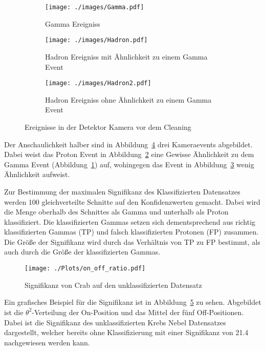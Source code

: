 \begin{figure}[H]
  \centering
\begin{subfigure}[t]{0.3\textwidth}
  \centering
  \texttt{[image: ./images/Gamma.pdf]}
  \caption{Gamma Ereigniss}
  \label{fig:gammaevent}
\end{subfigure}
\begin{subfigure}[t]{0.3\textwidth}
  \centering
  \texttt{[image: ./images/Hadron.pdf]}
  \caption{Hadron Ereigniss mit Ähnlichkeit zu einem Gamma Event}
  \label{fig:hadevent}
\end{subfigure}
\begin{subfigure}[t]{0.3\textwidth}
  \centering
  \texttt{[image: ./images/Hadron2.pdf]}
  \caption{Hadron Ereigniss ohne Ähnlichkeit zu einem Gamma Event}
  \label{fig:had2event}
\end{subfigure}
\caption{Ereignisse in der Detektor Kamera vor dem Cleaning \cite{??}}
\label{fig:picevents}
\end{figure}
Der Anschaulichkeit halber sind in Abbildung~\ref{fig:picevents} drei Kameraevents abgebildet.
Dabei weist das Proton Event in Abbildung~\ref{fig:hadevent} eine Gewisse Ähnlichkeit zu dem Gamma Event (Abbildung~\ref{fig:gammaevent}) auf, wohingegen das Event in Abbildung~\ref{fig:had2event} wenig Ähnlichkeit aufweist.

Zur Bestimmung der maximalen Signifikanz des Klassifizierten Datensatzes werden 100 gleichverteilte Schnitte auf den Konfidenzwerten gemacht.
Dabei wird die Menge oberhalb des Schnittes als Gamma und unterhalb als Proton klassifiziert. 
Die klassifizierten Gammas setzen sich dementsprechend aus richtig klassifizierten Gammas (TP) und falsch klassifizierten Protonen (FP) zusammen. 
Die Größe der Signifikanz wird durch das Verhältnis von TP zu FP bestimmt, als auch durch die Größe der klassifizierten Gammas.
\begin{figure}[H]
  \centering
  \texttt{[image: ./Plots/on\_off\_ratio.pdf]}
  \caption{Signifikanz von Crab auf den unklassifizierten Datensatz}
  \label{fig:sig_crab}
\end{figure}
Ein grafisches Beispiel für die Signifikanz ist in Abbildung~\ref{fig:sig_crab} zu sehen. 
Abgebildet ist die $\theta^{2}$-Verteilung der On-Position und das Mittel der fünf Off-Positionen.
Dabei ist die Signifikanz des unklassifizierten Krebs Nebel Datensatzes dargestellt, welcher bereits ohne Klassifizierung mit einer Signifikanz von \SI{21,4}{\sigma} nachgewiesen werden kann.

